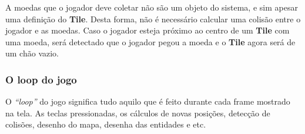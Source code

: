 	A moedas que o jogador deve coletar não são um objeto do sistema, e sim apesar uma definição do \textbf{Tile}. Desta forma, não é necessário calcular uma colisão entre o jogador e as moedas. Caso o jogador esteja próximo ao centro de um \textbf{Tile} com uma moeda, será detectado que o jogador pegou a moeda e o \textbf{Tile} agora será de um chão vazio.
	
\subsubsection{O loop do jogo}\label{loop}

O \textit{“loop”} do jogo significa tudo aquilo que é feito durante cada frame mostrado na tela. As teclas pressionadas, os cálculos de novas posições, detecção de colisões, desenho do mapa, desenha das entidades e etc.

